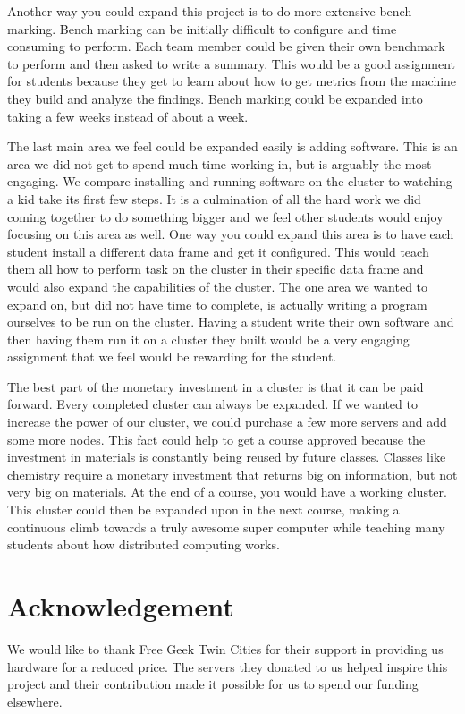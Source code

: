 \documentclass[12pt]{article}
\begin{document}
Another way you could expand this project is to do more extensive bench marking. Bench marking can be initially difficult to configure and time consuming to perform. Each team member could be given their own benchmark to perform and then asked to write a summary. This would be a good assignment for students because they get to learn about how to get metrics from the machine they build and analyze the findings. Bench marking could be expanded into taking a few weeks instead of about a week.

The last main area we feel could be expanded easily is adding software. This is an area we did not get to spend much time working in, but is arguably the most engaging. We compare installing and running software on the cluster to watching a kid take its first few steps. It is a culmination of all the hard work we did coming together to do something bigger and we feel other students would enjoy focusing on this area as well. One way you could expand this area is to have each student install a different data frame and get it configured. This would teach them all how to perform task on the cluster in their specific data frame and would also expand the capabilities of the cluster. The one area we wanted to expand on, but did not have time to complete, is actually writing a program ourselves to be run on the cluster. Having a student write their own software and then having them run it on a cluster they built would be a very engaging assignment that we feel would be rewarding for the student.

The best part of the monetary investment in a cluster is that it can be paid forward. Every completed cluster can always be expanded. If we wanted to increase the power of our cluster, we could purchase a few more servers and add some more nodes. This fact could help to get a course approved because the investment in materials is constantly being reused by future classes. Classes like chemistry require a monetary investment that returns big on information, but not very big on materials. At the end of a course, you would have a working cluster. This cluster could then be expanded upon in the next course, making a continuous climb towards a truly awesome super computer while teaching many students about how distributed computing works.

%
%
\section{Acknowledgement}
We would like to thank Free Geek Twin Cities for their support in providing us hardware for a reduced price. The servers they donated to us helped inspire this project and their contribution made it possible for us to spend our funding elsewhere. 
\end{document}

